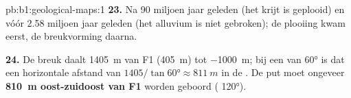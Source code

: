 \begin{solution}{pb:b1:geological-maps:1}
\textbf{23.} Na 90 miljoen jaar geleden (het krijt is geplooid) en vóór 2.58 miljoen jaar geleden (het
alluvium is niet gebroken); de plooiing kwam eerst, de breukvorming daarna.

\textbf{24.} De breuk daalt \qty{1405}{m} van F1 (\qty{405}{m}) tot
\qty{-1000}{m}; bij een  van \ang{60} is dat een horizontale afstand van
$1405/\tan\ang{60} \approx \qty{811}{m}$ in de . De put moet ongeveer
\textbf{\qty[text-series-to-math=true]{810}{m} oost-zuidoost van F1} worden geboord ( \ang{120}).
\end{solution}
